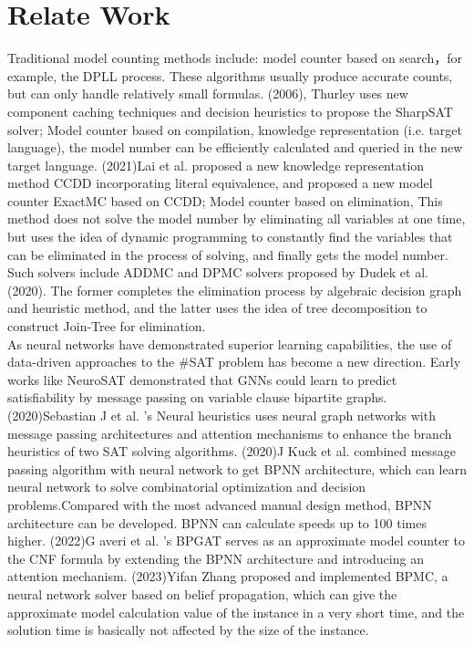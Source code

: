 \section{Relate Work}
Traditional model counting methods include: model counter based on search，for example, the DPLL process. 
These algorithms usually produce accurate counts, but can only handle relatively small formulas. (2006), 
Thurley uses new component caching techniques and decision heuristics to propose the SharpSAT solver\cite{B9}; 
Model counter based on compilation, knowledge representation (i.e. target language), the model number 
can be efficiently calculated and queried in the new target language.  (2021)Lai et al. proposed a new 
knowledge representation method CCDD\cite{A21} incorporating literal equivalence, and proposed a new model 
counter ExactMC\cite{A22} based on CCDD; Model counter based on elimination, This method does not solve 
the model number by eliminating all variables at one time, but uses the idea of dynamic programming to 
constantly find the variables that can be eliminated in the process of solving, and finally gets the model 
number. Such solvers include ADDMC\cite{A20} and DPMC\cite{A23} solvers proposed by Dudek et al. (2020). 
The former completes the elimination process by algebraic decision graph and heuristic method, and the latter 
uses the idea of tree decomposition to construct Join-Tree for elimination.\\

As neural networks have demonstrated superior learning capabilities, the use of data-driven approaches to the 
\#SAT problem has become a new direction. Early works like NeuroSAT\cite{A24} demonstrated that GNNs could learn 
to predict satisfiability by message passing on  variable clause bipartite graphs. (2020)Sebastian J et al. 's 
Neural heuristics\cite{A25} uses neural graph networks with message passing architectures and attention mechanisms 
to enhance the branch heuristics of two SAT solving algorithms. (2020)J Kuck et al. combined message passing 
algorithm with neural network to get BPNN architecture, which can learn neural network to solve combinatorial 
optimization and decision problems.Compared with the most advanced manual design method, BPNN architecture can 
be developed. BPNN can calculate speeds up to 100 times higher. (2022)G averi et al. 's BPGAT\cite{A26} serves 
as an approximate model counter to the CNF formula by extending the BPNN architecture and introducing an attention 
mechanism. (2023)Yifan Zhang proposed and implemented BPMC\cite{M1}, a neural network solver based on belief propagation, 
which can give the approximate model calculation value of the instance in a very short time, and the solution time is 
basically not affected by the size of the instance.
